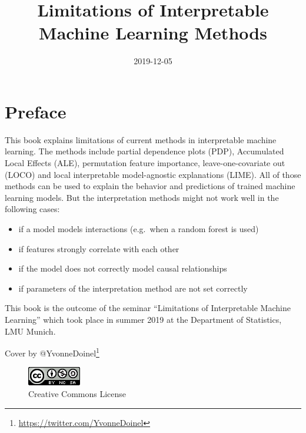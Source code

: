 \documentclass[]{krantz}
\title{Limitations of Interpretable Machine Learning Methods}
\date{2019-12-05}
\providecommand{\tightlist}{%
  \setlength{\itemsep}{0pt}\setlength{\parskip}{0pt}}
\renewcommand{\href}[2]{#2\footnote{\url{#1}}}
\begin{document}
\maketitle


\thispagestyle{empty}

\begin{center}
\end{center}

\setlength{\abovedisplayskip}{-5pt}
\setlength{\abovedisplayshortskip}{-5pt}

{
\hypersetup{linkcolor=black}
\setcounter{tocdepth}{0}
\tableofcontents
}
\chapter*{Preface}\label{preface}


This book explains limitations of current methods in interpretable
machine learning. The methods include partial dependence plots (PDP),
Accumulated Local Effects (ALE), permutation feature importance,
leave-one-covariate out (LOCO) and local interpretable model-agnostic
explanations (LIME). All of those methods can be used to explain the
behavior and predictions of trained machine learning models. But the
interpretation methods might not work well in the following cases:

\begin{itemize}
\tightlist
\item
  if a model models interactions (e.g.~when a random forest is used)
\item
  if features strongly correlate with each other
\item
  if the model does not correctly model causal relationships
\item
  if parameters of the interpretation method are not set correctly
\end{itemize}

This book is the outcome of the seminar ``Limitations of Interpretable
Machine Learning'' which took place in summer 2019 at the Department of
Statistics, LMU Munich.

Cover by \href{https://twitter.com/YvonneDoinel}{@YvonneDoinel}

\begin{figure}
\centering
\includegraphics{images/by-nc-sa.png}
\caption{Creative Commons License}
\end{figure}
\end{document}
